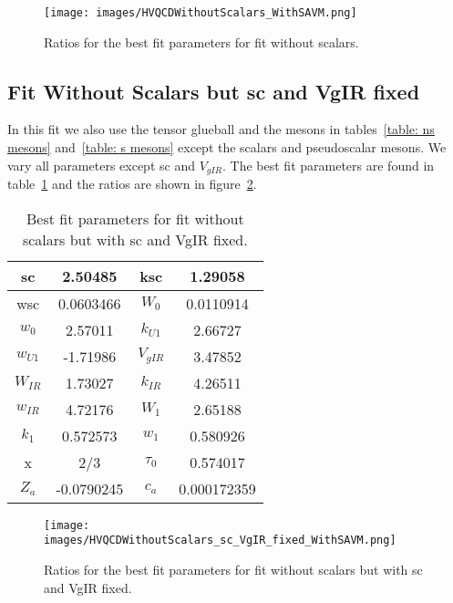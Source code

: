 \documentclass[10 pt]{article}
\begin{document}
\begin{figure}
  \center
  \texttt{[image: images/HVQCDWithoutScalars\_WithSAVM.png]} 
  \caption{Ratios for the best fit parameters for fit without scalars.}
  \label{figure: fit without scalars}
\end{figure}


\subsection{Fit Without Scalars but sc and VgIR fixed}

In this fit we also use the tensor glueball and the mesons in tables~\ref{table: ns mesons} and~\ref{table: s mesons} except the scalars and pseudoscalar mesons. We vary all parameters except sc and $V_{gIR}$. The best fit parameters are found in table~\ref{table: fit without scalars sc VgIR fixed} and the ratios are shown in figure~\ref{figure: fit without scalars sc VgIR fixed}.

\begin{table}
\centering
\begin{tabular}{ | c | c | c | c |}
\hline
sc & 2.50485 & ksc & 1.29058 \\
\hline
wsc & 0.0603466 & $W_0$ & 0.0110914 \\
\hline
$w_0$ & 2.57011 & $k_{U1}$ & 2.66727  \\
\hline
$w_{U1}$ & -1.71986 & $V_{gIR}$ & 3.47852 \\
\hline
$W_{IR}$ & 1.73027 & $k_{IR}$ & 4.26511 \\
\hline
$w_{IR}$ & 4.72176 & $W_1$ & 2.65188 \\
\hline
$k_1$ & 0.572573 & $w_1$ & 0.580926 \\
\hline
x & 2/3& $\tau_0$ & 0.574017\\
\hline
$Z_a$ & -0.0790245 & $c_a$ & 0.000172359 \\
\hline
\end{tabular}
\caption{Best fit parameters for fit without scalars but with sc and VgIR fixed.}
\label{table: fit without scalars sc VgIR fixed} 
\end{table}

\begin{figure}
  \center
  \texttt{[image: images/HVQCDWithoutScalars\_sc\_VgIR\_fixed\_WithSAVM.png]} 
  \caption{Ratios for the best fit parameters for fit without scalars but with sc and VgIR fixed.}
  \label{figure: fit without scalars sc VgIR fixed}
\end{figure}
\end{document}
